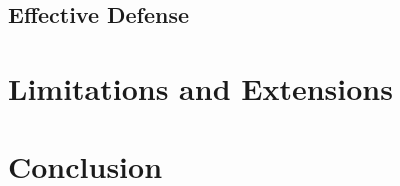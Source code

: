 \documentclass{acm_proc_article-sp}
\begin{document}
    \subsection{Effective Defense}
\section{Limitations and Extensions}
\section{Conclusion}

	

{}  %
\nocite{*}
%
%
\balancecolumns
\end{document}
